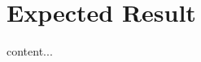 \documentclass[crop=false]{standalone}
\begin{document}
	\section{Expected Result}
	content...
\end{document}
